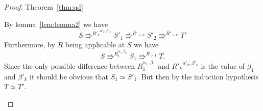 \begin{proof}{Theorem~\ref{thm:qd}}
\begin{description}
      By lemma~\ref{lem:lemma2} we have
      \begin{equation*}
        S \Rrightarrow^{{R'_k}^{\alpha'_k, \beta'_k}} S'_1 \Rrightarrow^{\bar{R'}_{<k}}
        S'_2 \Rrightarrow^{\bar{R'}_{>k}} T'
      \end{equation*}
      Furthermore, by $\bar{R}$ being applicable at $S$ we have
      \begin{equation*}
        S \Rrightarrow^{R_1^{\alpha_1, \beta_2}} S_1 \Rrightarrow^{\bar{R}_{>1}}
        T.
      \end{equation*}
      Since the only possible difference between $R_1^{\alpha_1, \beta_1}$ and
      ${R'_k}^{\alpha'_k, \beta'_k}$ is the value of $\beta_1$ and $\beta'_k$ it
      should be obvious that $S_1 \simeq S'_1$. But then by the induction hypothesis 
      $T \simeq T'$.
  \end{description}
\end{proof}






